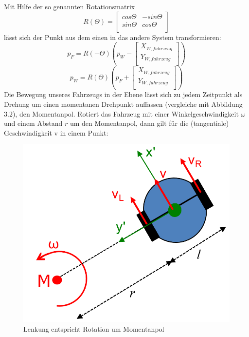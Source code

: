 Mit Hilfe der so genannten Rotationsmatrix 
\begin{equation}
R(\Theta) = 
\begin{bmatrix}
cos \Theta & -sin \Theta\\
sin \Theta & cos \Theta\\
\end{bmatrix}
\end{equation}
lässt sich der Punkt aus dem einen in das andere System transformieren: 
\begin{equation}
p_{F} = R(-\Theta)(p_{W}- \begin{bmatrix}
X_{W, fahrzeug} \\
Y_{W, fahrzeug} \\
\end{bmatrix})
\end{equation}
\begin{equation}
p_{W} = R(\Theta)(p_{F}+ \begin{bmatrix}
X_{W, fahrzeug} \\
Y_{W, fahrzeug} \\
\end{bmatrix})
\end{equation}
Die Bewegung unseres Fahrzeugs in der Ebene lässt sich zu jedem Zeitpunkt als Drehung um einen momentanen Drehpunkt auffassen (vergleiche mit Abbildung 3.2), den Momentanpol\cite{robot}. Rotiert das Fahrzeug mit einer Winkelgeschwindigkeit $\omega$ und einem Abstand $r$ um den Momentanpol, dann gilt für die (tangentiale) Geschwindigkeit v in einem Punkt:
\begin{figure}[htb]
  \centering  
  \includegraphics[scale=1]{img/einfachesModell_2.png}
  \caption{Lenkung entspricht Rotation um Momentanpol\cite{robot}}
  \label{fig:Lenkung entspricht Rotation um Momentanpol}
\end{figure}
